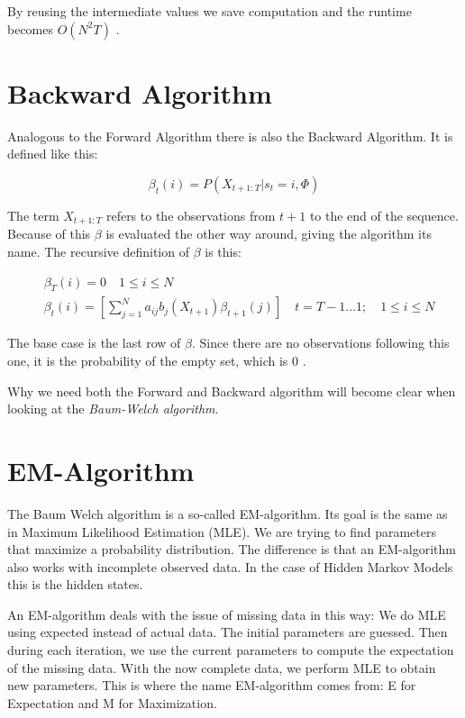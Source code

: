 By reusing the intermediate values we save computation and the runtime becomes $O(N^2 T)$ \parencite{huang2001spoken}. 

\section{Backward Algorithm}

Analogous to the Forward Algorithm there is also the Backward Algorithm. It is defined like this:

\begin{equation}
   \beta_{t}(i)=P\left(X_{t+1:T} | s_{t}=i, \Phi\right) 
\end{equation}

The term $X_{t+1:T}$ refers to the observations from $t+1$ to the end of the sequence. Because of this $\beta$ is evaluated the other way around, giving the algorithm its name. The recursive definition of $\beta$ is this:

\begin{equation}
\begin{aligned}
   &\beta_{T}(i)=0 \quad 1 \leq i \leq N  \\
   &\beta_{t}(i)=\left[\sum_{j=1}^{N} a_{i j} b_{j}\left(X_{t+1}\right) \beta_{t+1}(j)\right] \quad t=T-1 \ldots 1 ; \quad 1 \leq i \leq N
   \label{eq:beta-def}
\end{aligned}
\end{equation}

The base case is the last row of $\beta$. Since there are no observations following this one, it is the probability of the empty set, which is 0 \parencite{huang2001spoken}.

Why we need both the Forward and Backward algorithm will become clear when looking at the \emph{Baum-Welch algorithm}.

\section{EM-Algorithm}

The Baum Welch algorithm is a so-called EM-algorithm. Its goal is the same as in Maximum Likelihood Estimation (MLE). We are trying to find parameters that maximize a probability distribution. The difference is that an EM-algorithm also works with incomplete observed data. In the case of Hidden Markov Models this is the hidden states. 

An EM-algorithm deals with the issue of missing data in this way: We do MLE using expected instead of actual data. The initial parameters are guessed. Then during each iteration, we use the current parameters to compute the expectation of the missing data. With the now complete data, we perform MLE to obtain new parameters. This is where the name EM-algorithm comes from: E for Expectation and M for Maximization. 
 
